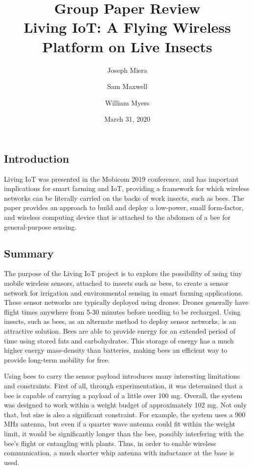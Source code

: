 \documentclass[letterpaper,twocolumn,10pt]{article}
\title{Group Paper Review\\
Living IoT: A Flying Wireless Platform on Live Insects}
\author{Joseph Miera}
\author{Sam Maxwell}
\author{William Myers}
\affil{}
\date{March 31, 2020}
\begin{document}
\maketitle


\subsection*{Introduction}

Living IoT was presented in the Mobicom 2019 conference, and has important implications for smart farming and IoT, providing a framework for which wireless networks can be literally carried on the backs of work insects, such as bees. The paper provides an approach to build and deploy a low-power, small form-factor, and wireless computing device that is attached to the abdomen of a bee for general-purpose sensing.

\subsection*{Summary}
 
The purpose of the Living IoT project is to explore the possibility of using tiny mobile wireless sensors, attached to insects such as bees, to create a sensor network for irrigation and environmental sensing in smart farming applications. These sensor networks are typically deployed using drones. Drones generally have flight times anywhere from 5-30 minutes before needing to be recharged. Using insects, such as bees, as an alternate method to deploy sensor networks, is an attractive solution. Bees are able to provide energy for an extended period of time using stored fats and carbohydrates. This storage of energy has a much higher energy mass-density than batteries, making bees an efficient way to provide long-term mobility for free. 
 
Using bees to carry the sensor payload introduces many interesting limitations and constraints. First of all, through experimentation, it was determined that a bee is capable of carrying a payload of a little over 100 mg. Overall, the system was designed to work within a weight budget of approximately 102 mg. Not only that, but size is also a significant constraint. For example, the system uses a 900 MHz antenna, but even if a quarter wave antenna could fit within the weight limit, it would be significantly longer than the bee, possibly interfering with the bee's flight or entangling with plants. Thus, in order to enable wireless communication, a much shorter whip antenna with inductance at the base is used. 
\end{document}
